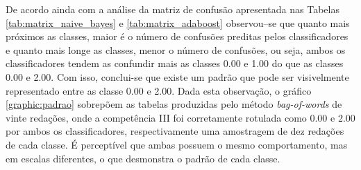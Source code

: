 De acordo ainda com a análise da matriz de confusão apresentada nas Tabelas 
\ref{tab:matrix_naive_bayes} e \ref{tab:matrix_adaboost} observou--se que 
quanto mais próximos as classes, maior é o número de confusões preditas pelos 
classificadores e quanto mais longe as classes, menor o número de confusões, ou 
seja, ambos os classificadores tendem as confundir mais as classes 0.00 e 1.00 do 
que as classes 0.00 e 2.00. Com isso, conclui-se que existe um padrão que pode 
ser visivelmente representado entre as classe 0.00 e 2.00. Dada esta 
observação, o gráfico \ref{graphic:padrao} sobrepõem as tabelas produzidas pelo 
método \textit{bag-of-words} de vinte redações, onde a competência III foi 
corretamente rotulada como 0.00 e 2.00 por ambos os classificadores, 
respectivamente uma amostragem de dez redações de cada classe. É perceptível 
que ambas possuem o mesmo comportamento, mas em escalas diferentes, o que 
desmonstra o padrão de cada classe. 

